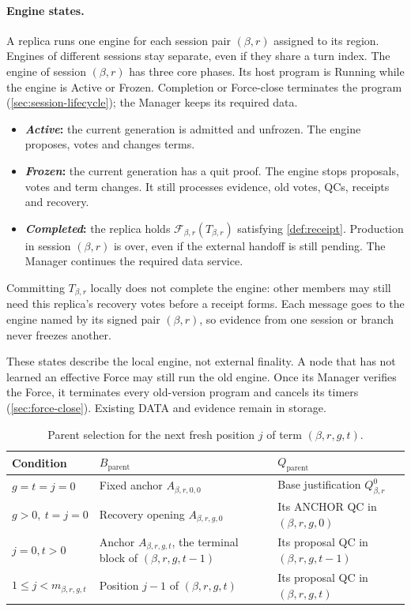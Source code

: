\documentclass[11pt,a4paper]{article}
\newcommand{\FC}{\mathcal F}
\newcommand{\defterm}[1]{\textcolor{rrBlue}{\textit{#1}}}
\begin{document}
\paragraph{Engine states.}
A replica runs one engine for each session pair $(\beta,r)$ assigned to
its region. Engines of different sessions stay separate, even if they
share a turn index. The engine of session $(\beta,r)$ has three core
phases. Its host program is Running while the engine is Active or
Frozen. Completion or Force-close terminates the program
(\cref{sec:session-lifecycle}); the Manager keeps its required data.
\begin{itemize}
\item \textbf{\defterm{Active}:} the current generation is admitted and
unfrozen. The engine proposes, votes and changes terms.
\item \textbf{\defterm{Frozen}:} the current generation has a quit proof.
The engine stops proposals, votes and term changes. It still processes
evidence, old votes, QCs, receipts and recovery.
\item \textbf{\defterm{Completed}:} the replica holds
$\FC_{\beta,r}(T_{\beta,r})$ satisfying \cref{def:receipt}. Production in
session $(\beta,r)$ is over, even if the external handoff is still
pending. The Manager continues the required data service.
\end{itemize}
Committing $T_{\beta,r}$ locally does not complete the engine: other
members may still need this replica's recovery votes before a receipt
forms. Each message goes to the engine named by its signed pair
$(\beta,r)$, so evidence from one session or branch never freezes
another.

These states describe the local engine, not external finality.
A node that has not learned an effective Force may still run the old
engine. Once its Manager verifies the Force, it terminates every
old-version program and cancels its timers (\cref{sec:force-close}).
Existing DATA and evidence remain in storage.

\begin{table}[htbp]\centering\small
\caption{Parent selection for the next fresh position $j$ of term $(\beta,r,g,t)$.}
\label{tab:parent}
\begin{tabularx}{\linewidth}{@{}l Y Y@{}}
\toprule
Condition & $B_{\mathrm{parent}}$ & $Q_{\mathrm{parent}}$\\
\midrule
$g=t=j=0$ & Fixed anchor $A_{\beta,r,0,0}$ & Base justification $Q^0_{\beta,r}$\\
$g>0,\ t=j=0$ & Recovery opening $A_{\beta,r,g,0}$ & Its ANCHOR QC in $(\beta,r,g,0)$\\
$j=0,t>0$ & Anchor $A_{\beta,r,g,t}$, the terminal block of $(\beta,r,g,t-1)$ & Its proposal QC in $(\beta,r,g,t-1)$\\
$1\le j<m_{\beta,r,g,t}$ & Position $j-1$ of $(\beta,r,g,t)$ & Its proposal QC in $(\beta,r,g,t)$\\
\bottomrule
\end{tabularx}
\end{table}
\end{document}
